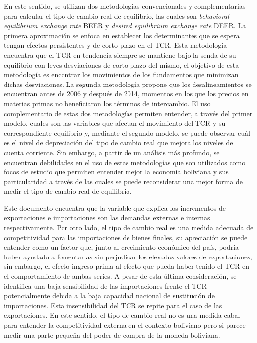 \documentclass[12pt,letterpaper]{article}
\begin{document}
En este sentido, se utilizan dos metodologías convencionales y complementarias para calcular el tipo de cambio real de equilibrio, las cuales son \emph{behavioral equilibrium exchange rate} BEER y \emph{desired equilibrium exchange rate} DEER. La primera aproximación se enfoca en establecer los determinantes que se espera tengan efectos persistentes y de corto plazo en el TCR. Esta metodología encuentra que el TCR en tendencia siempre se mantiene bajo la senda de su equilibrio con leves desviaciones de corto plazo del mismo, el objetivo de esta metodología es encontrar los movimientos de los fundamentos que minimizan dichas desviaciones. La segunda metodología propone que los desalineamientos se encuentran antes de 2006 y después de 2014, momentos en los que los precios en materias primas no beneficiaron los términos de intercambio. El uso complementario de estas dos metodologías permiten entender, a través del primer modelo, cuales son las variables que afectan el movimiento del TCR y su correspondiente equilibrio y, mediante el segundo modelo, se puede observar cuál es el nivel de depreciación del tipo de cambio real que mejora los niveles de cuenta corriente. Sin embargo, a partir de un análisis más profundo, se encuentran debilidades en el uso de estas metodologías que son utilizados como focos de estudio que permiten entender mejor la economía boliviana y sus particularidad a través de las cuales se puede reconsiderar una mejor forma de medir el tipo de cambio real de equilibrio.

Este documento encuentra que la variable que explica los incrementos de exportaciones e importaciones son las demandas externas e internas respectivamente. Por otro lado, el tipo de cambio real es una medida adecuada de competitividad para las importaciones de bienes finales, su apreciación se puede entender como un factor que, junto al crecimiento económico del país, podría haber ayudado a fomentarlas sin perjudicar los elevados valores de exportaciones, sin embargo, el efecto ingreso prima al efecto que pueda haber tenido el TCR en el comportamiento de ambas series. A pesar de esta última consideración, se identifica una baja sensibilidad de las importaciones frente el TCR potencialmente debida a la baja capacidad nacional de sustitución de importaciones. Esta insensibilidad del TCR se repite para el caso de las exportaciones. En este sentido, el tipo de cambio real no es una medida cabal para entender la competitividad externa en el contexto boliviano pero si parece medir una parte pequeña del poder de compra de la moneda boliviana. 
\end{document}
